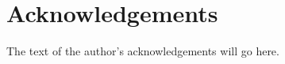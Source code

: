 \cleardoublepage
\chapter*{Acknowledgements}

\noindent The text of the author's acknowledgements will go here. 